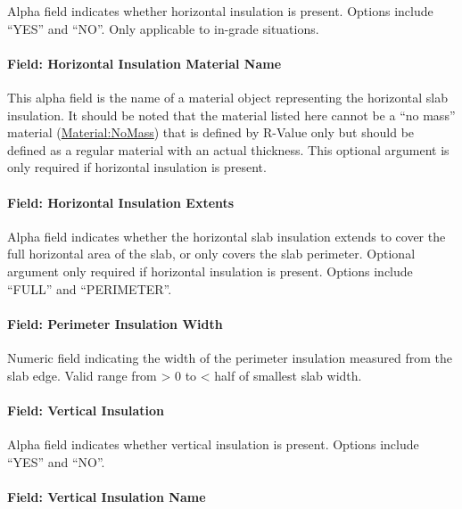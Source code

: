 Alpha field indicates whether horizontal insulation is present. Options include ``YES'' and ``NO''. Only applicable to in-grade situations.

\paragraph{Field: Horizontal Insulation Material Name}\label{field-horizontal-insulation-material-name}

This alpha field is the name of a material object representing the horizontal slab insulation. It should be noted that the material listed here cannot be a ``no mass'' material (\hyperref[materialnomass]{Material:NoMass}) that is defined by R-Value only but should be defined as a regular material with an actual thickness. This optional argument is only required if horizontal insulation is present.

\paragraph{Field: Horizontal Insulation Extents}\label{field-horizontal-insulation-extents}

Alpha field indicates whether the horizontal slab insulation extends to cover the full horizontal area of the slab, or only covers the slab perimeter. Optional argument only required if horizontal insulation is present. Options include ``FULL'' and ``PERIMETER''.

\paragraph{Field: Perimeter Insulation Width}\label{field-perimeter-insulation-width}

Numeric field indicating the width of the perimeter insulation measured from the slab edge. Valid range from \textgreater{} 0 to \textless{} half of smallest slab width.

\paragraph{Field: Vertical Insulation}\label{field-vertical-insulation}

Alpha field indicates whether vertical insulation is present. Options include ``YES'' and ``NO''.

\paragraph{Field: Vertical Insulation Name}\label{field-vertical-insulation-name}

